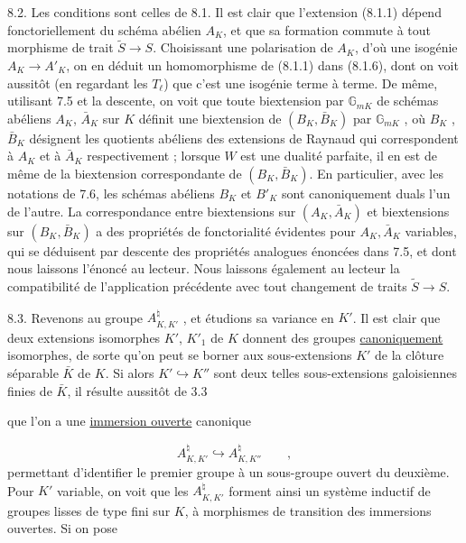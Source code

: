 8.2. Les conditions sont celles de 8.1. Il est clair que l'extension (8.1.1) dépend fonctoriellement du schéma abélien $A_K$, et que sa formation commute à tout morphisme de trait $\tilde{S} \longrightarrow S$. Choisissant une polarisation de $A_K$, d'où une isogénie $A_K \longrightarrow A'_K$, on en déduit un homomorphisme de (8.1.1) dans (8.1.6), dont on voit aussitôt (en regardant les $T_\ell$) que c'est une isogénie terme à terme. De même, utilisant 7.5 et la descente, on voit que toute biextension par $\mathbb{G}_{mK}$ de schémas abéliens $A_K$, $\bar{A}_K$ sur $K$ définit une biextension de $(B_K,\bar{B}_K)$ par $\mathbb{G}_{mK}$ , où $B_K$ , $\bar{B}_K$ désignent les quotients abéliens des extensions de Raynaud qui correspondent à $A_K$ et à $\bar{A}_K$ respectivement ; lorsque $W$ est une dualité parfaite, il en est de même de la biextension correspondante de $(B_K,\bar{B}_K)$. En particulier, avec les notations de 7.6, les schémas abéliens $B_K$ et $B'_K$ sont canoniquement duals l'un de l'autre. La correspondance entre biextensions sur $(A_K,\bar{A}_K)$ et biextensions sur $(B_K, \bar{B}_K)$ a des propriétés de fonctorialité évidentes pour $A_K,\bar{A}_K$ variables, qui se déduisent par descente des propriétés analogues énoncées dans 7.5, et dont nous laissons l'énoncé au lecteur. Nous laissons également au lecteur la compatibilité de l'application précédente avec tout changement de traits $\tilde{S} \longrightarrow S$.

8.3. Revenons au groupe $A_{K,K'}^{\natural}$ , et étudions sa variance en $K'$. Il est clair que deux extensions isomorphes $K'$, $K'_1$ de $K$ donnent des groupes \underline{canoniquement} isomorphes, de sorte qu'on peut se borner aux sous-extensions $K'$ de la clôture séparable $\bar{K}$ de $K$. Si alors $K' \hookrightarrow K''$ sont deux telles sous-extensions galoisiennes finies de $\bar{K}$, il résulte aussitôt de 3.3



que l'on a une \underline{immersion ouverte} canonique

\begin{equation}\tag{8.3.1}
A^{\natural}_{K,K'} \hookrightarrow A^{\natural}_{K,K''} \qquad ,
\end{equation}
permettant d'identifier le premier groupe à un sous-groupe ouvert du deuxième. Pour $K'$ variable, on voit que les $A^{\natural}_{K,K'}$ forment ainsi un système inductif de groupes lisses de type fini sur $K$, à morphismes de transition des immersions ouvertes. Si on pose

